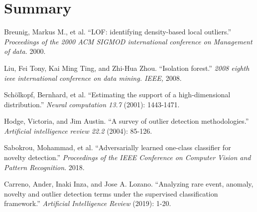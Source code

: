 \documentclass{article}
\begin{document}
\section{Summary}


\begin{thebibliography}{10}

 Breunig, Markus M., et al. ``LOF: identifying density-based local outliers.'' {\em Proceedings of the 2000 ACM SIGMOD international conference on Management of data.} 2000.
  
 Liu, Fei Tony, Kai Ming Ting, and Zhi-Hua Zhou. ``Isolation forest.'' {\em 2008 eighth ieee international conference on data mining. IEEE,} 2008.

 Sch\"{o}lkopf, Bernhard, et al. ``Estimating the support of a high-dimensional distribution.'' {\em Neural computation 13.7} (2001): 1443-1471.

  Hodge, Victoria, and Jim Austin. ``A survey of outlier detection methodologies.'' {\em Artificial intelligence review 22.2} (2004): 85-126.

 Sabokrou, Mohammad, et al. ``Adversarially learned one-class classifier for novelty detection.'' {\em Proceedings of the IEEE Conference on Computer Vision and Pattern Recognition}. 2018.

 Carreno, Ander, Inaki Inza, and Jose A. Lozano. ``Analyzing rare event, anomaly, novelty and outlier detection terms under the supervised classification framework.'' {\em Artificial Intelligence Review} (2019): 1-20.
\end{thebibliography}
\end{document}
